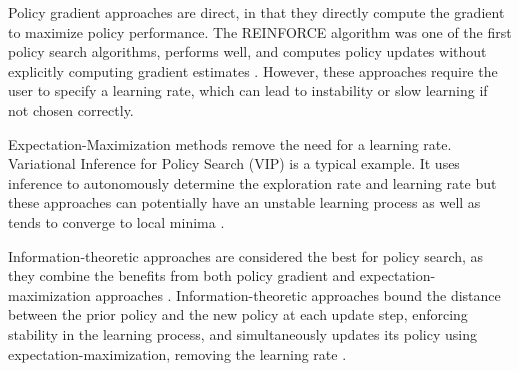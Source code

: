 \documentclass{article}
\begin{document}
Policy gradient approaches are direct, in that they directly compute the gradient to maximize policy performance. The REINFORCE algorithm was one of the first policy search algorithms, performs well, and computes policy updates without explicitly computing gradient estimates \cite{Williams92simplestatistical}. However, these approaches require the user to specify a learning rate, which can lead to instability or slow learning if not chosen correctly.

Expectation-Maximization methods remove the need for a learning rate. Variational Inference for Policy Search (VIP) is a typical example. It uses inference to autonomously determine the exploration rate and learning rate \cite{conf/icml/Neumann11} but these approaches can potentially have an unstable learning process as well as tends to converge to local minima \cite{journals/ftrob/DeisenrothNP13}. 

Information-theoretic approaches are considered the best for policy search, as they combine the benefits from both policy gradient and expectation-maximization approaches \cite{journals/ftrob/DeisenrothNP13}. Information-theoretic approaches bound the distance between the prior policy and the new policy at each update step, enforcing stability in the learning process, and simultaneously updates its policy using expectation-maximization, removing the learning rate \cite{journals/ftrob/DeisenrothNP13}.  %
\end{document}
